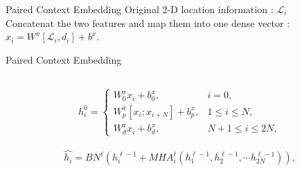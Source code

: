 \documentclass{beamer}
\begin{document}
\begin{frame}{Paired Context Embedding}
	Original 2-D location information : $\mathcal{L}_{i}$ \\
	Concatenat the two features and map them into one dense vector : $x_{i}=W^{x}[\mathcal{L}_{i},d_{i}]+b^{x}.$\\

\end{frame}

\begin{frame}{Paired Context Embedding}
	\begin{columns}
		\begin{column}{0.6\textwidth}
			\footnotesize
			\begin{align}
				h_i^0=\begin{cases}W_0^xx_i+b_0^x,&i=0,\\W_p^x[x_i;x_{i+N}]+b_p^x,&1\le i\le N,\\W_d^xx_i+b_d^x,&N+1\le i\le2N,\end{cases}
			\end{align}

			\begin{align}
				\hat{h_{i}}=BN^{\ell}(h_{i}^{\ell-1}+MHA_{i}^{\ell}(h_{1}^{\ell-1},h_{2}^{\ell-1},\cdots h_{2N}^{\ell-1})),
			\end{align}


\end{column}
\end{columns}
\end{frame}
\end{document}
